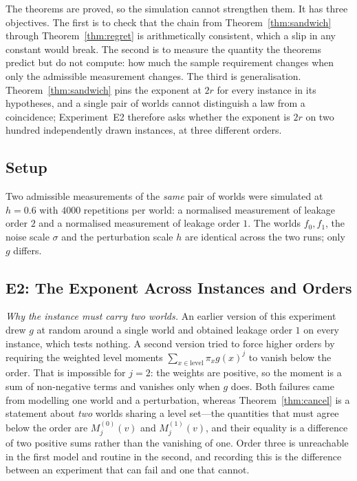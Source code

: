 The theorems are proved, so the simulation cannot strengthen them. It has three objectives.
The first is to check that the chain from Theorem~\ref{thm:sandwich} through
Theorem~\ref{thm:regret} is arithmetically consistent, which a slip in any constant would
break. The second is to measure the quantity the theorems predict but do not compute: how
much the sample requirement changes when only the admissible measurement changes. The third
is generalisation. Theorem~\ref{thm:sandwich} pins the exponent at $2r$ for every instance in
its hypotheses, and a single pair of worlds cannot distinguish a law from a coincidence;
Experiment~E2 therefore asks whether the exponent is $2r$ on two hundred independently drawn
instances, at three different orders.

\subsection{Setup}

Two admissible measurements of the \emph{same} pair of worlds were simulated at $h=0.6$ with
$4000$ repetitions per world: a normalised measurement of leakage order $2$ and a normalised
measurement of leakage order $1$. The worlds $f_{0},f_{1}$, the noise scale $\sigma$ and the
perturbation scale $h$ are identical across the two runs; only $g$ differs.

\subsection{E2: The Exponent Across Instances and Orders}
\label{sec:e2}

\emph{Why the instance must carry two worlds.} An earlier version of this experiment drew $g$
at random around a single world and obtained leakage order $1$ on every instance, which tests
nothing. A second version tried to force higher orders by requiring the weighted level moments
$\sum_{x\in\text{level}}\pi_{x}g(x)^{j}$ to vanish below the order. That is impossible for
$j=2$: the weights are positive, so the moment is a sum of non-negative terms and vanishes
only when $g$ does. Both failures came from modelling one world and a perturbation, whereas
Theorem~\ref{thm:cancel} is a statement about \emph{two} worlds sharing a level set---the
quantities that must agree below the order are $M^{(0)}_{j}(v)$ and $M^{(1)}_{j}(v)$, and
their equality is a difference of two positive sums rather than the vanishing of one. Order
three is unreachable in the first model and routine in the second, and recording this is the
difference between an experiment that can fail and one that cannot.

